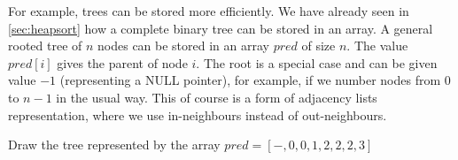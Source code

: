 For example, trees can be stored more efficiently. We have already
seen in \cref{sec:heapsort} how a complete binary tree can be
stored in an array. A general rooted tree of $n$ nodes can be stored in
an array $pred$ of size $n$. The value $pred[i]$ gives the parent of
node $i$. The root is a special case and can be given value $-1$
(representing a NULL pointer), for example, if we number nodes from $0$
to $n-1$ in the usual way. This of course is a form of adjacency lists
representation, where we use in-neighbours instead of out-neighbours.

\begin{Boxample}[2]
Draw the tree represented by the array $pred = [-,0,0,1,2,2,2,3]$
\end{Boxample}

